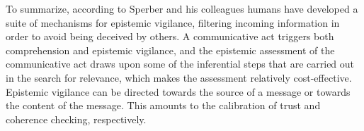 
To summarize, according to Sperber and his colleagues humans have developed a suite of mechanisms for epistemic vigilance, filtering incoming information in order to avoid being deceived by others. A communicative act triggers both comprehension and epistemic vigilance, and the epistemic assessment of the communicative act draws upon some of the inferential steps that are carried out in the search for relevance, which makes the assessment relatively cost-effective. Epistemic vigilance can be directed towards the source of a message or towards the content of the message. This amounts to the calibration of trust and coherence checking, respectively.
